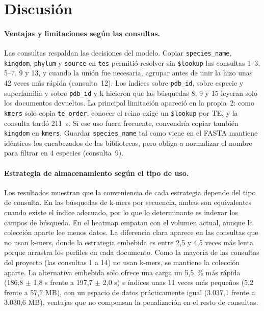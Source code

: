 \documentclass[unnumsec,namedate,webpdf,contemporary,large]{oup-authoring-template}
\begin{document}
\section{Discusi\'on}

\paragraph{Ventajas y limitaciones seg\'un las consultas.}
Las consultas respaldan las decisiones del modelo. Copiar \texttt{species\_name}, \texttt{kingdom}, \texttt{phylum} y \texttt{source} en \texttt{tes} permiti\'o resolver sin \texttt{\$lookup} las consultas 1--3, 5--7, 9 y 13, y cuando la uni\'on fue necesaria, agrupar antes de unir la hizo unas 42 veces m\'as r\'apida (consulta~12). Los \'indices sobre \texttt{pdb\_id}, sobre especie y superfamilia y sobre \texttt{pdb\_id} y k hicieron que las b\'usquedas 8, 9 y 15 leyeran solo los documentos devueltos. La principal limitaci\'on apareci\'o en la propia~2: como \texttt{kmers} solo copia \texttt{te\_order}, conocer el reino exige un \texttt{\$lookup} por TE, y la consulta tard\'o 211~s. Si ese uso fuera frecuente, convendr\'ia copiar tambi\'en \texttt{kingdom} en \texttt{kmers}. Guardar \texttt{species\_name} tal como viene en el FASTA mantiene id\'enticos los encabezados de las bibliotecas, pero obliga a normalizar el nombre para filtrar en 4 especies (consulta~9).

\paragraph{Estrategia de almacenamiento seg\'un el tipo de uso.}
Los resultados muestran que la conveniencia de cada estrategia depende del tipo de consulta. En las b\'usquedas de k-mers por secuencia, ambas son equivalentes cuando existe el \'indice adecuado, por lo que lo determinante es indexar los campos de b\'usqueda. En el heatmap empatan con el volumen actual, aunque la colecci\'on aparte lee menos datos. La diferencia clara aparece en las consultas que no usan k-mers, donde la estrategia embebida es entre 2,5 y 4,5 veces m\'as lenta porque arrastra los perfiles en cada documento. Como la mayor\'ia de las consultas del proyecto (las consultas 1 a 14) no usan k-mers, se mantiene la colecci\'on aparte. La alternativa embebida solo ofrece una carga un 5,5~\% m\'as r\'apida (186,8 $\pm$ 1,8 s frente a 197,7 $\pm$ 2,0 s) e \'indices unas 11 veces m\'as peque\~nos (5,2 frente a 57,7 MB), con un espacio de datos pr\'acticamente igual (3.037,1 frente a 3.030,6 MB), ventajas que no compensan la penalizaci\'on en el resto de consultas.
\end{document}
